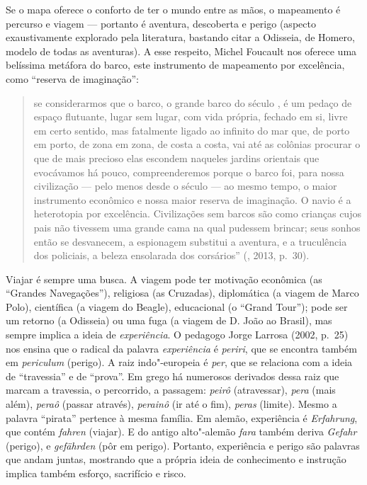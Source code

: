 Se o mapa oferece o conforto de ter o mundo entre as mãos, o mapeamento
é percurso e viagem --- portanto é aventura, descoberta e perigo (aspecto
exaustivamente explorado pela literatura, bastando citar a Odisseia, de
Homero, modelo de todas as aventuras). A esse respeito, Michel Foucault
nos oferece uma belíssima metáfora do barco, este instrumento de
mapeamento por excelência, como ``reserva de imaginação'':

\begin{quote}
se considerarmos que o barco, o grande barco do século , é um pedaço
de espaço flutuante, lugar sem lugar, com vida própria, fechado em si,
livre em certo sentido, mas fatalmente ligado ao infinito do mar que, de
porto em porto, de zona em zona, de costa a costa, vai até as colônias
procurar o que de mais precioso elas escondem naqueles jardins orientais
que evocávamos há pouco, compreenderemos porque o barco foi, para nossa
civilização --- pelo menos desde o século  --- ao mesmo tempo, o maior
instrumento econômico e nossa maior reserva de imaginação. O navio é a
heterotopia por excelência. Civilizações sem barcos são como crianças
cujos pais não tivessem uma grande cama na qual pudessem brincar; seus
sonhos então se desvanecem, a espionagem substitui a aventura, e a
truculência dos policiais, a beleza ensolarada dos corsários''
(, 2013, p.~30).
\end{quote}

Viajar é sempre uma busca. A viagem pode ter motivação econômica (as
``Grandes Navegações''), religiosa (as Cruzadas), diplomática (a viagem
de Marco Polo), científica (a viagem do Beagle), educacional (o ``Grand
Tour''); pode ser um retorno (a Odisseia) ou uma fuga (a viagem de D.
João  ao Brasil), mas sempre implica a ideia de \emph{experiência}. O
pedagogo Jorge Larrosa (2002, p.~25) nos ensina que o radical da palavra
\emph{experiência} é \emph{periri}, que se encontra também em
\emph{periculum} (perigo). A raiz indo"-europeia é \emph{per}, que se
relaciona com a ideia de ``travessia'' e de ``prova''. Em grego há
numerosos derivados dessa raiz que marcam a travessia, o percorrido, a
passagem: \emph{peirô} (atravessar), \emph{pera} (mais além),
\emph{peraô} (passar através), \emph{perainô} (ir até o fim),
\emph{peras} (limite). Mesmo a palavra ``pirata'' pertence à mesma
família. Em alemão, experiência é \emph{Erfahrung}, que contém
\emph{fahren} (viajar). E do antigo alto"-alemão \emph{fara} também
deriva \emph{Gefahr} (perigo), e \emph{gefährden} (pôr em perigo).
Portanto, experiência e perigo são palavras que andam juntas, mostrando
que a própria ideia de conhecimento e instrução implica também
esforço, sacrifício e risco.

